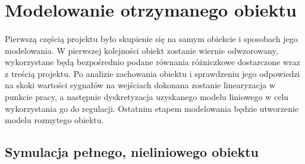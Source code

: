 \documentclass[a4paper,12pt]{article}
\begin{document}
\section{Modelowanie otrzymanego obiektu}
\paragraph{}
Pierwszą częścią projektu było skupienie się na samym obiekcie i sposobach jego modelowania.
W pierwszej kolejności obiekt zostanie wiernie odwzorowany, wykorzystane będą bezpośrednio podane równania różniczkowe dostarczone wraz z treścią projektu.
Po analizie zachowania obiektu i sprawdzeniu jego odpowiedzi na skoki wartości sygnałów na wejściach dokonana zostanie linearyzacja w punkcie pracy, a następnie dyskretyzacja uzyskanego modelu liniowego w celu wykorzystania go do regulacji.
Ostatnim etapem modelowania będzie utworzenie modelu rozmytego obiektu.


\subsection{Symulacja pełnego, nieliniowego obiektu}
\end{document}
